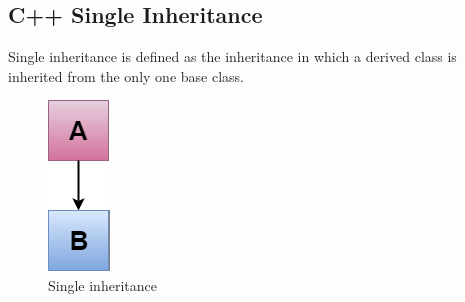 \documentclass{book}
\begin{document}
\subsection{C++ Single Inheritance}

Single inheritance is defined as the inheritance in which a derived class is inherited from the only one base class. 

\begin{figure}[h]
\includegraphics[width=\columnwidth]{single-inheritance}%
\caption{Single inheritance}%
\label{}%
\end{figure}
\end{document}
